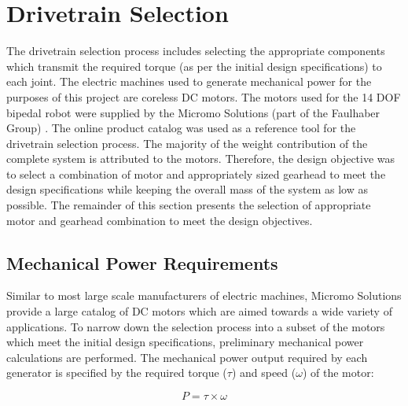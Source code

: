 \section{Drivetrain Selection} %
\label{sec:drivetrain}
The drivetrain selection process includes selecting the appropriate components which transmit the required torque (as per the initial design specifications) to each joint. The electric machines used to generate mechanical power for the purposes of this project are coreless DC motors. The motors used for the 14 DOF bipedal robot were supplied by the Micromo Solutions (part of the Faulhaber Group) \cite{sw:micromo}. The online product catalog was used as a reference tool for the drivetrain selection process. The majority of the weight contribution of the complete system is attributed to the motors. Therefore, the design objective was to select a combination of motor and appropriately sized gearhead to meet the design specifications while keeping the overall mass of the system as low as possible. The remainder of this section presents the selection of appropriate motor and gearhead combination to meet the design objectives. 

\subsection{Mechanical Power Requirements} %
\label{sub:mechanical_power_requirements}
Similar to most large scale manufacturers of electric machines, Micromo Solutions provide a large catalog of DC motors which are aimed towards a wide variety of applications. To narrow down the selection process into a subset of the motors which meet the initial design specifications, preliminary mechanical power calculations are performed. The mechanical power output required by each generator is specified by the required torque ($\tau$) and speed ($\omega$) of the motor: 

\begin{equation}
	P = \tau \times \omega
\end{equation}

